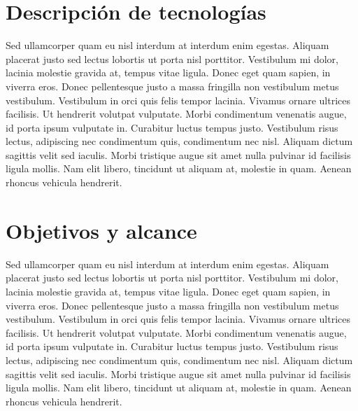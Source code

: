 \section{Descripción de tecnologías}

Sed ullamcorper quam eu nisl interdum at interdum enim egestas. Aliquam placerat justo sed lectus lobortis ut porta nisl porttitor. Vestibulum mi dolor, lacinia molestie gravida at, tempus vitae ligula. Donec eget quam sapien, in viverra eros. Donec pellentesque justo a massa fringilla non vestibulum metus vestibulum. Vestibulum in orci quis felis tempor lacinia. Vivamus ornare ultrices facilisis. Ut hendrerit volutpat vulputate. Morbi condimentum venenatis augue, id porta ipsum vulputate in. Curabitur luctus tempus justo. Vestibulum risus lectus, adipiscing nec condimentum quis, condimentum nec nisl. Aliquam dictum sagittis velit sed iaculis. Morbi tristique augue sit amet nulla pulvinar id facilisis ligula mollis. Nam elit libero, tincidunt ut aliquam at, molestie in quam. Aenean rhoncus vehicula hendrerit.



\section{Objetivos y alcance}

Sed ullamcorper quam eu nisl interdum at interdum enim egestas. Aliquam placerat justo sed lectus lobortis ut porta nisl porttitor. Vestibulum mi dolor, lacinia molestie gravida at, tempus vitae ligula. Donec eget quam sapien, in viverra eros. Donec pellentesque justo a massa fringilla non vestibulum metus vestibulum. Vestibulum in orci quis felis tempor lacinia. Vivamus ornare ultrices facilisis. Ut hendrerit volutpat vulputate. Morbi condimentum venenatis augue, id porta ipsum vulputate in. Curabitur luctus tempus justo. Vestibulum risus lectus, adipiscing nec condimentum quis, condimentum nec nisl. Aliquam dictum sagittis velit sed iaculis. Morbi tristique augue sit amet nulla pulvinar id facilisis ligula mollis. Nam elit libero, tincidunt ut aliquam at, molestie in quam. Aenean rhoncus vehicula hendrerit.

